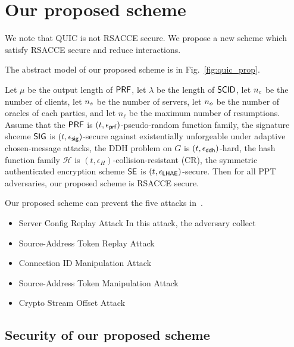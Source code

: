 \section{Our proposed scheme} \label{sec:proposed_scheme}

We note that QUIC is not RSACCE secure.
We propose a new scheme which satisfy RSACCE secure and
reduce interactions.

The abstract model of our proposed scheme is in
Fig.~\ref{fig:quic_prop}.




\begin{theorem} \label{theorem:proposed_scheme}
 Let $\mu$ be the output length of $\mathsf{PRF}$, let $\lambda$ be
 the length of $\mathsf{SCID}$, let $n_c$ be the number of
 clients, let $n_s$ be the number of servers, let
 $n_o$ be the number of oracles of each parties, and
 let $n_{\ell}$ be the maximum number of resumptions. Assume
 that the $\mathsf{PRF}$ is $(t, \epsilon_{\mathsf{prf}})$-pseudo-random
 function family, the signature shceme
 $\mathsf{SIG}$ is $(t, \epsilon_{\mathsf{sig}})$-secure against existentially
 unforgeable under adaptive chosen-message attacks, the DDH
 problem on $G$ is $(t, \epsilon_{\mathsf{ddh}})$-hard, the hash
 function family $\mathcal{H}$ is
 $(t,\epsilon_{H})$-collision-resistant (CR), the symmetric
 authenticated encryption scheme $\mathsf{SE}$ is
 $(t, \epsilon_{\mathsf{LHAE}})$-secure.
 Then for all PPT adversaries, our proposed scheme is RSACCE secure.
\end{theorem}

Our proposed scheme can prevent the five attacks in~\cite{LJBN15:QUIC}.

\begin{itemize}
 \item{Server Config Replay Attack}
  In this attack, the adversary collect
 \item{Source-Address Token Replay Attack}
 \item{Connection ID Manipulation Attack}
 \item{Source-Address Token Manipulation Attack}
 \item{Crypto Stream Offset Attack}
\end{itemize}

\subsection{Security of our proposed scheme} \label{sec:quic_proof}

